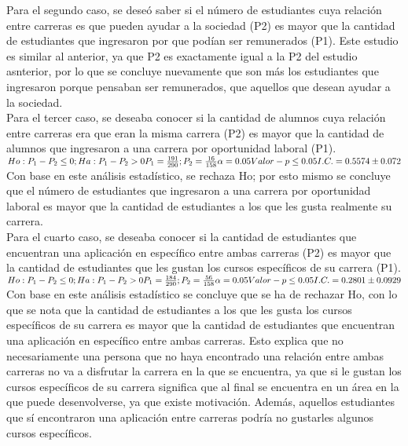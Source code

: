 Para el segundo caso, se deseó saber si el número de estudiantes cuya relación entre carreras es que pueden ayudar a la sociedad (P2) es mayor que la cantidad de estudiantes que ingresaron por que podían ser remunerados (P1). Este estudio es similar al anterior, ya que P2 es exactamente igual a la P2 del estudio asnterior, por lo que se concluye nuevamente que son más los estudiantes que ingresaron porque pensaban ser remunerados, que aquellos que desean ayudar a la sociedad. \\

Para el tercer caso, se deseaba conocer si la cantidad de alumnos cuya relación entre carreras era que eran la misma carrera (P2) es mayor que la cantidad de alumnos que ingresaron a una carrera por oportunidad laboral (P1). \\

\begin{math}
	Ho: P_{1} - P_{2} \leq 0; 
	Ha: P_{1} - P_{2} > 0 \\
	P_{1} = \frac{191}{290}; P_{2} = \frac{16}{158} \\
	\alpha = 0.05\\
	Valor-p\leq 0.05\\
	I.C.= 0.5574 \pm 0.072\\
\end{math}
\\
Con base en este análisis estadístico, se rechaza Ho; por esto mismo se concluye que el número de estudiantes que ingresaron a una carrera por oportunidad laboral es mayor que la cantidad de estudiantes a los que les gusta realmente su carrera. \\

Para el cuarto caso, se deseaba conocer si la cantidad de estudiantes que encuentran una aplicación en específico entre ambas carreras (P2) es mayor que la cantidad de estudiantes que les gustan los cursos específicos de su carrera (P1). \\

\begin{math}
	Ho: P_{1} - P_{2} \leq 0; 
	Ha: P_{1} - P_{2} > 0 \\
	P_{1} = \frac{184}{290}; P_{2} = \frac{56}{158} \\
	\alpha = 0.05\\
	Valor-p\leq 0.05\\
	I.C.= 0.2801 \pm 0.0929\\
\end{math}
\\
Con base en este análisis estadístico se concluye que se ha de rechazar Ho, con lo que se nota que la cantidad de estudiantes a los que les gusta los cursos específicos de su carrera es mayor que la cantidad de estudiantes que encuentran una aplicación en específico entre ambas carreras. Esto explica que no necesariamente una persona que no haya encontrado una relación entre ambas carreras no va a disfrutar la carrera en la que se encuentra, ya que si le gustan los cursos específicos de su carrera significa que al final se encuentra en un área en la que puede desenvolverse, ya que existe motivación. Además, aquellos estudiantes que sí encontraron una aplicación entre carreras podría no gustarles algunos cursos específicos. \\


